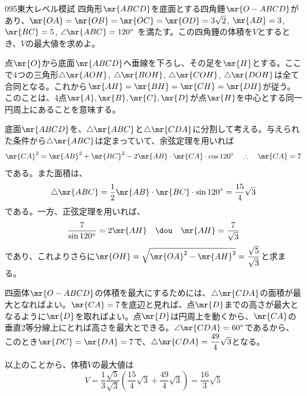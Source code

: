 \begin{prob}{095}{}{東大レベル模試}
 四角形$\mr{ABCD}$を底面とする四角錘$\mr{O-ABCD}$があり、$\mr{OA}=\mr{OB}=\mr{OC}=\mr{OD}=3\sqrt{2}$, $\mr{AB}=3$, $\mr{BC}=5$, $\angle\mr{ABC}=120^\circ$ を満たす。この四角錘の体積を$V$とするとき、$V$の最大値を求めよ。
\end{prob}
点$\mr{O}$から底面$\mr{ABCD}$へ垂線を下ろし、その足を$\mr{H}$とする。ここで4つの三角形$\triangle\mr{AOH}$, $\triangle\mr{BOH}$, $\triangle\mr{COH}$, $\triangle\mr{DOH}$は全て合同となる。これから$\mr{AH}=\mr{BH}=\mr{CH}=\mr{DH}$が従う。このことは、4点$\mr{A}, \mr{B}, \mr{C}, \mr{D}$が点$\mr{H}$を中心とする同一円周上にあることを意味する。

底面$\mr{ABCD}$を、$\triangle\mr{ABC}$と$\triangle\mr{CDA}$に分割して考える。与えられた条件から$\triangle\mr{ABC}$は定まっていて、余弦定理を用いれば
\[ \mr{CA}^2=\mr{AB}^2+\mr{BC}^2-2\mr{AB}\cdot\mr{CA}\cdot\cos 120^\circ \quad\therefore\quad \mr{CA}=7 \]
である。また面積は、
\[ \triangle\mr{ABC}=\frac{1}{2}\mr{AB}\cdot\mr{BC}\cdot\sin 120^\circ=\frac{15}{4}\sqrt{3} \]
である。一方、正弦定理を用いれば、
\[ \frac{7}{\sin 120^\circ}=2\mr{AH} \quad\dou\quad \mr{AH}=\frac{7}{\sqrt{3}} \]
であり、これよりさらに$\mr{OH}=\sqrt{\mr{OA}^2-\mr{AH}^2}=\dfrac{\sqrt{5}}{\sqrt{3}}$と求まる。

四面体$\mr{O-ABCD}$の体積を最大にするためには、$\triangle\mr{CDA}$の面積が最大となればよい。$\mr{CA}=7$を底辺と見れば、点$\mr{D}$までの高さが最大となるように$\mr{D}$を取ればよい。点$\mr{D}$は円周上を動くから、$\mr{CA}$の垂直2等分線上にとれば高さを最大とできる。$\angle\mr{CDA}=60^\circ$であるから、このとき$\mr{DC}=\mr{DA}=7$で、$\triangle\mr{CDA}=\dfrac{49}{4}\sqrt{3}$となる。

以上のことから、体積$V$の最大値は
\[ V=\frac{1}{3}\frac{\sqrt{5}}{\sqrt{3}}\left(\frac{15}{4}\sqrt{3}+\frac{49}{4}\sqrt{3}\right)=\frac{16}{3}\sqrt{5} \]